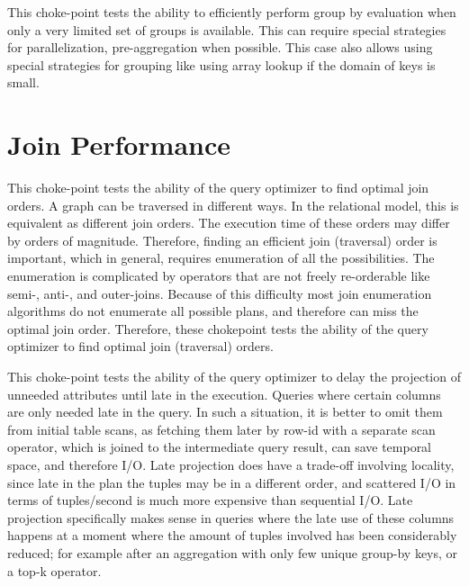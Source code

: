 


This choke-point tests the ability to efficiently perform group by evaluation when only a very limited set of groups is available.  This can require special strategies for parallelization, \eg pre-aggregation when possible. This case also allows using special strategies for grouping like using array lookup if the domain of keys is small.




\section{Join Performance}


This choke-point tests the ability of the query optimizer to find optimal join orders. A graph can be traversed in different ways. In the relational model, this is equivalent as different join orders.
The execution time of these orders may differ by orders of magnitude. Therefore, finding an efficient join (traversal) order is important, which in general, requires enumeration of all the possibilities.
The enumeration is complicated by operators that are not freely re-orderable like semi-, \mbox{anti-,} and outer-joins. Because of this difficulty most join enumeration algorithms do not enumerate all possible plans, and therefore can miss the optimal join order. Therefore, these chokepoint tests the ability of the query optimizer to find optimal join (traversal) orders.




This choke-point tests the ability of the query optimizer to delay the projection of unneeded attributes until late in the execution. Queries where certain columns are only needed late in the query.
In such a situation, it is better to omit them from initial table scans, as fetching them later by row-id with a separate scan operator, which is joined to the intermediate query result, can save temporal space, and therefore I/O.
Late projection does have a trade-off involving locality, since late in the plan the tuples may be in a different order, and scattered I/O in terms of tuples/second is much more expensive than sequential I/O.
Late projection specifically makes sense in queries where the late use of these columns happens at a moment where the amount of tuples involved has been considerably reduced;
for example after an aggregation with only few unique group-by keys, or a top-k operator.

